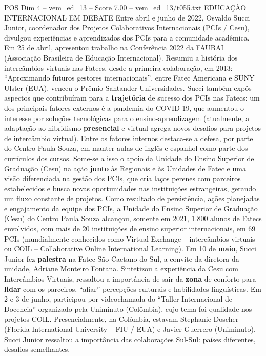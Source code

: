 \begin{textsample}{POS Dim 4 – vem\_ed\_13 – Score 7.00 – vem\_ed\_13/t055.txt}  \label{ex:f4_pos_027}
EDUCAÇÃO INTERNACIONAL EM DEBATE Entre abril e junho de 2022, Osvaldo Succi Junior, coordenador dos Projetos Colaborativos Internacionais (PCIs / Cesu), divulgou experiências e aprendizados dos PCIs para a comunidade acadêmica.
Em 25 de abril, apresentou trabalho na Conferência 2022 da FAUBAI (Associação Brasileira de Educação Internacional).
Resumiu a história dos intercâmbios virtuais nas Fatecs, desde a primeira colaboração, em 2013: “Aproximando futuros gestores internacionais”, entre Fatec Americana e SUNY Ulster (EUA), venceu o Prêmio Santander Universidades.
Succi também expôs aspectos que contribuíram para a \textbf{trajetória} de sucesso dos PCIs nas Fatecs: um dos principais fatores externos é a pandemia do COVID-19, que aumentou o interesse por soluções tecnológicas para o ensino-aprendizagem (atualmente, a adaptação ao hibridismo \textbf{presencial} e virtual agrega novos desafios para projetos de intercâmbio virtual).
Entre os fatores internos destaca-se a defesa, por parte do Centro Paula Souza, em manter aulas de inglês e espanhol como parte dos currículos dos cursos.
Some-se a isso o apoio da Unidade do Ensino Superior de Graduação (Cesu) na ação \textbf{junto} às Regionais e às Unidades de Fatec e uma visão diferenciada na gestão dos PCIs, que cria laços perenes com parceiros estabelecidos e busca novas oportunidades nas instituições estrangeiras, gerando um fluxo constante de projetos.
Como resultado de persistência, ações planejadas e engajamento da equipe dos PCIs, a Unidade do Ensino Superior de Graduação (Cesu) do Centro Paula Souza alcançou, somente em 2021, 1.800 alunos de Fatecs envolvidos, com mais de 20 instituições de ensino superior internacionais, em 69 PCIs (mundialmente conhecidos como Virtual Exchange – intercâmbios virtuais – ou COIL – Collaborative Online International Learning).
Em 10 de \textbf{maio}, Succi Junior fez \textbf{palestra} na Fatec São Caetano do Sul, a convite da diretora da unidade, Adriane Monteiro Fontana.
Sintetizou a experiência da Cesu com Intercâmbios Virtuais, ressaltou a importância de sair da \textbf{zona} de conforto para \textbf{lidar} com os parceiros, “afiar” percepções culturais e habilidades linguísticas.
Em 2 e 3 de junho, participou por videochamada do “Taller Internacional de Docencia” organizado pela Uniminuto (Colômbia), cujo tema foi qualidade nos projetos COIL.
Presencialmente, na Colômbia, estavam Stephanie Doscher (Florida International University – FIU / EUA) e Javier Guerrero (Uniminuto).
Succi Junior ressaltou a importância das colaborações Sul-Sul: países diferentes, desafios semelhantes.

\end{textsample}
